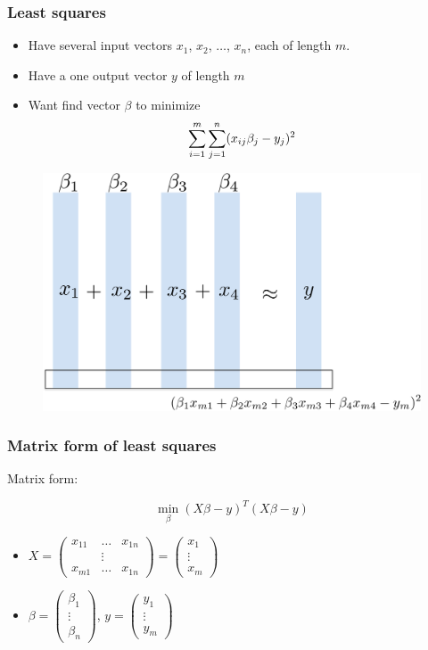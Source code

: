 \documentclass{beamer}
\begin{document}
\begin{frame}
\frametitle{Least squares}

\begin{itemize}
\item Have several input vectors $x_1$, $x_2$, $\ldots$, $x_n$, each of length $m$.
\item Have a one output vector $y$ of length $m$
\item Want find vector $\beta$ to minimize
\[
 \displaystyle\sum\limits_{i=1}^{m} \displaystyle\sum\limits_{j=1}^{n} (x_{ij}\beta_j - y_j)^2
 \]
\end{itemize}

\begin{figure}
\includegraphics[scale=0.3]{figs/lstsq.pdf}
\end{figure}

\end{frame}

\begin{frame}
\frametitle{Matrix form of least squares}

Matrix form:

\[
\min_{\beta} (X\beta - y)^T(X\beta - y)
\]

\vspace{1cm}

\begin{itemize}
\setlength{\itemsep}{0.5cm}
\item $X = \begin{pmatrix} x_{11} & \hdots & x_{1n} \\ & \vdots \\ x_{m1} & \hdots & x_{1n}\end{pmatrix} = \begin{pmatrix} x_1 \\ \vdots \\ x_m \end{pmatrix}$
\item $\beta = \begin{pmatrix}\beta_1 \\ \vdots \\ \beta_n\end{pmatrix}$,
$y = \begin{pmatrix}y_1 \\ \vdots \\ y_m\end{pmatrix}$
\end{itemize}

\end{frame}
\end{document}
